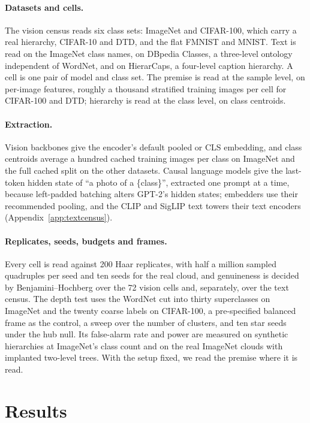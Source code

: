 \documentclass{article}
\theoremstyle{definition}
\theoremstyle{plain}
\theoremstyle{remark}
\begin{document}
\paragraph{Datasets and cells.} The vision census reads six class sets: ImageNet and CIFAR-100, which carry a real hierarchy, CIFAR-10 and DTD, and the flat FMNIST and MNIST. Text is read on the ImageNet class names, on DBpedia Classes, a three-level ontology independent of WordNet, and on HierarCaps, a four-level caption hierarchy. A cell is one pair of model and class set. The premise is read at the sample level, on per-image features, roughly a thousand stratified training images per cell for CIFAR-100 and DTD; hierarchy is read at the class level, on class centroids.

\paragraph{Extraction.} Vision backbones give the encoder's default pooled or CLS embedding, and class centroids average a hundred cached training images per class on ImageNet and the full cached split on the other datasets. Causal language models give the last-token hidden state of ``a photo of a \{class\}'', extracted one prompt at a time, because left-padded batching alters GPT-2's hidden states; embedders use their recommended pooling, and the CLIP and SigLIP text towers their text encoders (Appendix~\ref{app:textcensus}).

\paragraph{Replicates, seeds, budgets and frames.} Every cell is read against 200 Haar replicates, with half a million sampled quadruples per seed and ten seeds for the real cloud, and genuineness is decided by Benjamini--Hochberg over the 72 vision cells and, separately, over the text census. The depth test uses the WordNet cut into thirty superclasses on ImageNet and the twenty coarse labels on CIFAR-100, a pre-specified balanced frame as the control, a sweep over the number of clusters, and ten star seeds under the hub null. Its false-alarm rate and power are measured on synthetic hierarchies at ImageNet's class count and on the real ImageNet clouds with implanted two-level trees. With the setup fixed, we read the premise where it is read.

\section{Results}
\label{sec:form}
\end{document}
